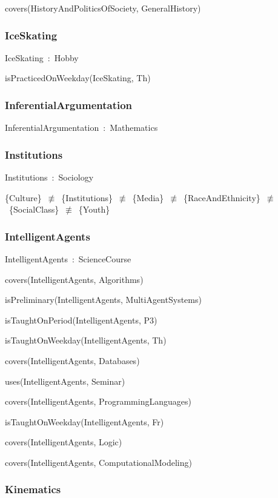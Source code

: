\documentclass{article}
\begin{document}
covers(HistoryAndPoliticsOfSociety, GeneralHistory)

\subsubsection*{IceSkating}

IceSkating~:~Hobby

isPracticedOnWeekday(IceSkating, Th)

\subsubsection*{InferentialArgumentation}

InferentialArgumentation~:~Mathematics

\subsubsection*{Institutions}

Institutions~:~Sociology

\{Culture\}~\ensuremath{\not\equiv}~\{Institutions\}~\ensuremath{\not\equiv}~\{Media\}~\ensuremath{\not\equiv}~\{RaceAndEthnicity\}~\ensuremath{\not\equiv}~\{SocialClass\}~\ensuremath{\not\equiv}~\{Youth\}

\subsubsection*{IntelligentAgents}

IntelligentAgents~:~ScienceCourse

covers(IntelligentAgents, Algorithms)

isPreliminary(IntelligentAgents, MultiAgentSystems)

isTaughtOnPeriod(IntelligentAgents, P3)

isTaughtOnWeekday(IntelligentAgents, Th)

covers(IntelligentAgents, Databases)

uses(IntelligentAgents, Seminar)

covers(IntelligentAgents, ProgrammingLanguages)

isTaughtOnWeekday(IntelligentAgents, Fr)

covers(IntelligentAgents, Logic)

covers(IntelligentAgents, ComputationalModeling)

\subsubsection*{Kinematics}
\end{document}
